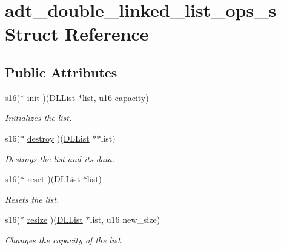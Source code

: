 \hypertarget{structadt__double__linked__list__ops__s}{}\section{adt\+\_\+double\+\_\+linked\+\_\+list\+\_\+ops\+\_\+s Struct Reference}
\label{structadt__double__linked__list__ops__s}
\subsection*{Public Attributes}
\begin{DoxyCompactItemize}
\item 
s16($\ast$ \hyperlink{structadt__double__linked__list__ops__s_a6ee8a6635bd532cd18304937ee45f374}{init} )(\hyperlink{structadt__double__linked__list__s}{D\+L\+List} $\ast$list, u16 \hyperlink{structadt__double__linked__list__ops__s_adfa3417ca009567eeb9382f735cf6482}{capacity})
\begin{DoxyCompactList}\small\item\em Initializes the list. \end{DoxyCompactList}\item 
s16($\ast$ \hyperlink{structadt__double__linked__list__ops__s_a6a421e311614328c17b11404bbfcc0c1}{destroy} )(\hyperlink{structadt__double__linked__list__s}{D\+L\+List} $\ast$$\ast$list)
\begin{DoxyCompactList}\small\item\em Destroys the list and it\textquotesingle{}s data. \end{DoxyCompactList}\item 
s16($\ast$ \hyperlink{structadt__double__linked__list__ops__s_a849787a1e33fd60d783ba6176e8727dd}{reset} )(\hyperlink{structadt__double__linked__list__s}{D\+L\+List} $\ast$list)
\begin{DoxyCompactList}\small\item\em Resets the list. \end{DoxyCompactList}\item 
s16($\ast$ \hyperlink{structadt__double__linked__list__ops__s_aadb76bb9698533203350f929f21883a4}{resize} )(\hyperlink{structadt__double__linked__list__s}{D\+L\+List} $\ast$list, u16 new\+\_\+size)
\begin{DoxyCompactList}\small\item\em Changes the capacity of the list. \end{DoxyCompactList}\item 
$$
\end{DoxyCompactItemize}
